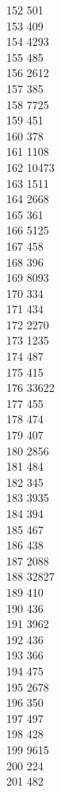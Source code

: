 { 152	501 \\
 153	409 \\
 154	4293 \\
 155	485 \\
 156	2612 \\
 157	385 \\
 158	7725 \\
 159	451 \\
 160	378 \\
 161	1108 \\
 162	10473 \\
 163	1511 \\
 164	2668 \\
 165	361 \\
 166	5125 \\
 167	458 \\
 168	396 \\
 169	8093 \\
 170	334 \\
 171	434 \\
 172	2270 \\
 173	1235 \\
 174	487 \\
 175	415 \\
 176	33622 \\
 177	455 \\
 178	474 \\
 179	407 \\
 180	2856 \\
 181	484 \\
 182	345 \\
 183	3935 \\
 184	394 \\
 185	467 \\
 186	438 \\
 187	2088 \\
 188	32827 \\
 189	410 \\
 190	436 \\
 191	3962 \\
 192	436 \\
 193	366 \\
 194	475 \\
 195	2678 \\
 196	350 \\
 197	497 \\
 198	428 \\
 199	9615 \\
 200	224 \\
 201	482 \\
}
